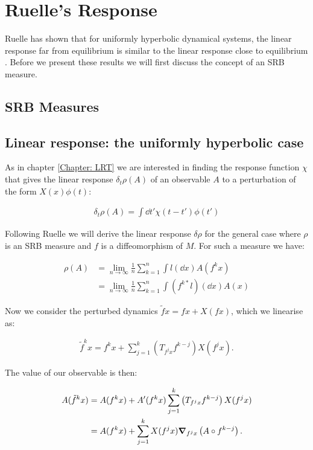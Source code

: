 \section{Ruelle's Response} \label{Section: Ruelle}
Ruelle has shown that for uniformly hyperbolic dynamical systems, the linear response far from equilibrium is similar to the linear response close to equilibrium \cite{Ruelle}. Before we present these results we will first discuss the concept of an SRB measure.

\subsection{SRB Measures}

\subsection{Linear response: the uniformly hyperbolic case}

As in chapter \ref{Chapter: LRT} we are interested in finding the response function $\chi$ that gives the linear response $\delta_t\rho (A)$ of an observable $A$ to a perturbation of the form $X(x)\phi(t)$:

\begin{align} \label{basic response}
\delta_t \rho(A) = \int \dd t' \chi(t - t') \phi (t')
\end{align}

\noindent Following Ruelle \cite{Ruelle} we will derive the linear response $\delta \rho$ for the general case where $\rho$ is an SRB measure and $f$ is a diffeomorphism of $M$. For such a measure we have:

\begin{align}
\rho(A) &= \lim_{n \to \infty} \frac{1}{n} \sum_{k=1} ^n \int l( \dd x) A (f^k x)\\
&= \lim_{n \to \infty} \frac{1}{n} \sum_{k=1} ^n \int (f^{k*}l)( \dd x) A (x)
\end{align}

\noindent Now we consider the perturbed dynamics $\tilde{f} x = f x + X(fx)$, which we linearise as:

\begin{align}
\tilde{f}^kx = f^k x + \sum_{j = 1}^k \left(T_{f^j x} f^{k - j} \right) X(f^j x).
\end{align}

\noindent The value of our observable is then:

\begin{align}
A(\tilde{f}^k x) &= A(f^k x) + A'(f^k x) \sum_{j = 1}^k \left(T_{f^j x} f^{k - j} \right) X(f^j x)\\
&= A(f^k x) + \sum_{j=1} ^k X(f^j x) \grad_{f^j x} \left(A \circ f ^{k -j} \right).
\end{align}

